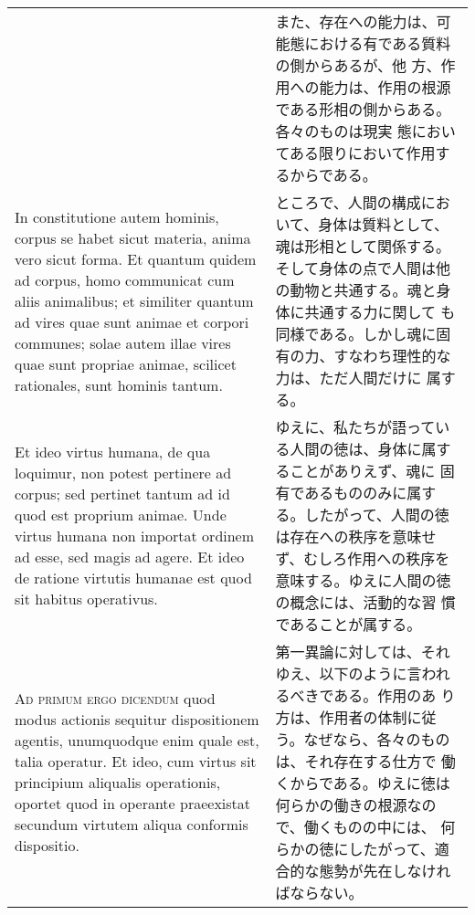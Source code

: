 \documentclass[10pt]{jsarticle}
\begin{document}
\begin{longtable}{p{21em}p{21em}}
&

また、存在への能力は、可能態における有である質料の側からあるが、他
方、作用への能力は、作用の根源である形相の側からある。各々のものは現実
態においてある限りにおいて作用するからである。


\\

In constitutione autem hominis, corpus se habet sicut materia, anima
vero sicut forma. Et quantum quidem ad corpus, homo communicat cum
aliis animalibus; et similiter quantum ad vires quae sunt animae et
corpori communes; solae autem illae vires quae sunt propriae animae,
scilicet rationales, sunt hominis tantum.


&

ところで、人間の構成において、身体は質料として、魂は形相として関係する。
そして身体の点で人間は他の動物と共通する。魂と身体に共通する力に関して
も同様である。しかし魂に固有の力、すなわち理性的な力は、ただ人間だけに
属する。


\\


Et ideo virtus humana, de qua loquimur, non potest pertinere ad
corpus; sed pertinet tantum ad id quod est proprium animae. Unde
virtus humana non importat ordinem ad esse, sed magis ad agere. Et
ideo de ratione virtutis humanae est quod sit habitus operativus.


&

ゆえに、私たちが語っている人間の徳は、身体に属することがありえず、魂に
固有であるもののみに属する。したがって、人間の徳は存在への秩序を意味せ
ず、むしろ作用への秩序を意味する。ゆえに人間の徳の概念には、活動的な習
慣であることが属する。


\\



{\scshape Ad primum ergo dicendum} quod modus actionis sequitur
dispositionem agentis, unumquodque enim quale est, talia operatur. Et
ideo, cum virtus sit principium aliqualis operationis, oportet quod in
operante praeexistat secundum virtutem aliqua conformis
dispositio. 


&

第一異論に対しては、それゆえ、以下のように言われるべきである。作用のあ
り方は、作用者の体制に従う。なぜなら、各々のものは、それ存在する仕方で
働くからである。ゆえに徳は何らかの働きの根源なので、働くものの中には、
何らかの徳にしたがって、適合的な態勢が先在しなければならない。

\\




\end{longtable}
\end{document}
